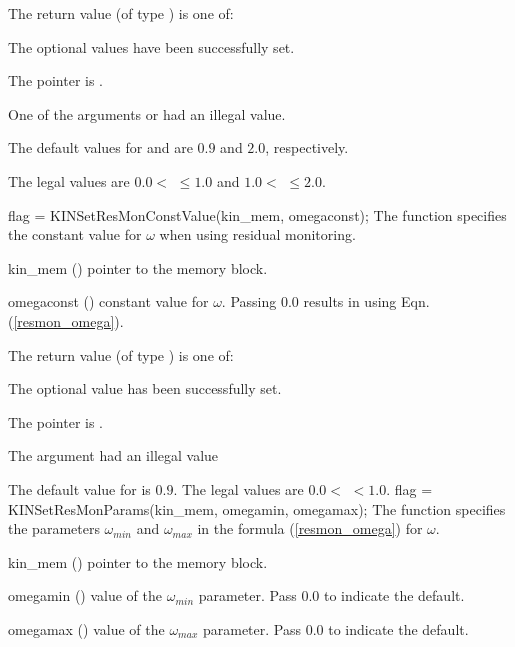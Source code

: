 {
  The return value  (of type ) is one of:
  \begin{args}
  \item[\Id{KIN\_SUCCESS}] 
    The optional values have been successfully set.
  \item[\Id{KIN\_MEM\_NULL}]
    The  pointer is .
  \item[\Id{KIN\_ILL\_INPUT}]
    One of the arguments  or  had an illegal value.
  \end{args}
}
{
  The default values for  and  are $0.9$ and $2.0$, respectively.

  The legal values are $0.0 <$  $\le 1.0$ and
  $1.0<$  $\le 2.0$. 
}
{
flag = KINSetResMonConstValue(kin\_mem, omegaconst);
}
{
  The function  specifies the constant value
  for $\omega$ when using residual monitoring.
}
{
  \begin{args}
  \item[kin\_mem] ()
    pointer to the {\kinsol} memory block.
  \item[omegaconst] ()
    constant value for $\omega$.  Passing $0.0$ results in using
    Eqn. (\ref{resmon_omega}).
  \end{args}
}
{
  The return value  (of type ) is one of:
  \begin{args}
  \item[\Id{KIN\_SUCCESS}] 
    The optional value has been successfully set.
  \item[\Id{KIN\_MEM\_NULL}]
    The  pointer is .
  \item[\Id{KIN\_ILL\_INPUT}]
    The argument  had an illegal value
  \end{args}
}
{
  The default value for  is $0.9$.
  The legal values are $0.0 <$  $< 1.0$.
}
{
flag = KINSetResMonParams(kin\_mem, omegamin, omegamax);
}
{
  The function  specifies the parameters $\omega_{min}$ and
  $\omega_{max}$ in the formula (\ref{resmon_omega}) for $\omega$.
}
{
  \begin{args}
  \item[kin\_mem] ()
    pointer to the {\kinsol} memory block.
  \item[omegamin] ()
    value of the $\omega_{min}$ parameter.  Pass $0.0$ to indicate the default.
  \item[omegamax] ()
    value of the $\omega_{max}$ parameter.  Pass $0.0$ to indicate the default.
  \end{args}
}

